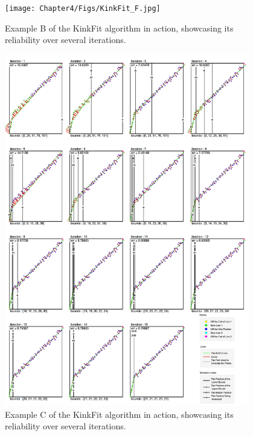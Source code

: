 

\begin{figure}[h!]
  \centering
    \texttt{[image: Chapter4/Figs/KinkFit\_F.jpg]}
    \caption{Example B of the KinkFit algorithm in action, showcasing its reliability over several iterations.}\label{fig:KinkFitF}
\end{figure}


\begin{figure}[h!]
  \centering
    \includegraphics[width=0.95\textwidth]{Chapter4/Figs/KinkFit_H.jpg}
    \caption{Example C of the KinkFit algorithm in action, showcasing its reliability over several iterations.}\label{fig:KinkFitH}
\end{figure}

